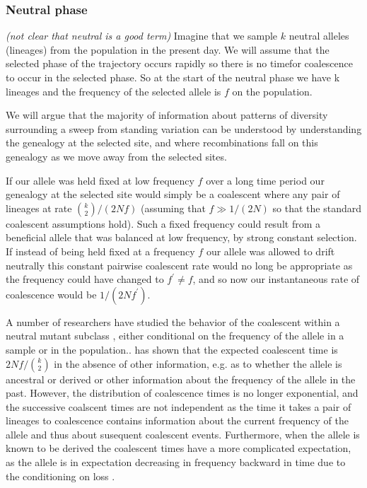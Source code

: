 \documentclass[a4paper,10pt]{article}
\newcommand{\gc}[1]{{\it \color{red} (#1)} }
\begin{document}
\subsubsection{Neutral phase} \gc{not clear that neutral is a good term}
Imagine that we sample $k$ neutral alleles (lineages) from the population in the present day. 
We will assume that the selected phase of the trajectory occurs rapidly so there is no timefor coalescence to occur in the selected phase. So at the start of the neutral phase we have k lineages and the frequency of the selected allele is $f$ on the population.

We will argue that the majority of information about patterns of diversity surrounding a sweep from standing variation can be understood by understanding the genealogy at the selected site,
and where recombinations fall on this genealogy as we move away from the selected sites. 

If our allele was held fixed at low frequency $f$ over a long time period our genealogy at the selected site would simply be a coalescent where any pair of lineages at rate $ {k \choose 2}/(2 N f)$ (assuming that $f \gg 1/(2N)$ so that the standard coalescent assumptions hold). Such a fixed frequency could result from a beneficial allele that was balanced at low frequency, by strong constant selection. If instead of being held fixed at a frequency $f$ our allele was allowed to drift neutrally this constant pairwise coalescent rate would no long be appropriate as the frequency could have changed to $f^{\prime} \neq f$, and so now our instantaneous rate of coalescence would be  $1/(2Nf^{\prime})$. 

A number of researchers have studied the behavior of the coalescent within a neutral mutant subclass \citep{XXXX}, either conditional on the frequency of the allele in a sample or in the population.. \cite{XXX} has shown that the expected coalescent time is  $2 N f/ {k \choose 2}$ in the absence of other information, e.g. as to whether the allele is ancestral or derived or other information about the frequency of the allele in the past. However, the distribution of coalescence times is no longer exponential, and the successive coalscent times are not independent \cite{} as the time it takes a pair of lineages to coalescence contains information about the current frequency of the allele and thus about susequent coalescent events. Furthermore, when the allele is known to be derived the coalescent times have a more complicated expectation, as the allele is in expectation decreasing in frequency backward in time due to the conditioning on loss \citep{}.
\end{document}
